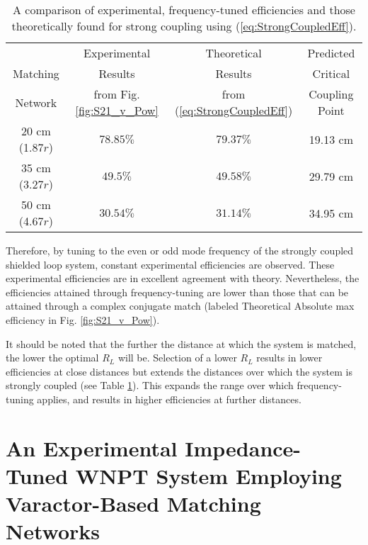 \documentclass[journal]{IEEEtran}
\begin{document}
\begin{table}[htbp]
\centering
\begin{tabular}{|c|c|c|c|}
\hline
                & {Experimental}                    & {Theoretical}                         &  {Predicted} \\
 {Matching}     & {Results}                         & {Results}                             &  {Critical} \\
 {Network}      & {from Fig. \ref{fig:S21_v_Pow}}   & {from (\ref{eq:StrongCoupledEff})}   & {Coupling Point} \\ \hline
20 cm (1.87$r$) & $78.85\%$                         & $79.37\%$                             & 19.13 cm \\ \hline
35 cm (3.27$r$) & $49.5\%$                         & $49.58\%$                              & 29.79 cm \\ \hline
50 cm (4.67$r$) & $30.54\%$                         & $31.14\%$                              & 34.95 cm \\ \hline
\end{tabular}
\caption{A comparison of experimental, frequency-tuned efficiencies and those theoretically found for strong coupling using (\ref{eq:StrongCoupledEff}).}
\label{table:ExpTheory_Comp}
\end{table}

Therefore, by tuning to the even or odd mode frequency of the strongly coupled shielded loop system, constant experimental efficiencies are observed. These experimental efficiencies are in excellent agreement with theory. Nevertheless, the efficiencies attained through frequency-tuning are lower than those that can be attained through a complex conjugate match (labeled Theoretical Absolute max efficiency in  Fig. \ref{fig:S21_v_Pow}).

It should be noted that the further the distance at which the system is matched, the lower the optimal $R_L$ will be. Selection of a lower $R_L$ results in lower efficiencies at close distances but extends the distances over which the system is strongly coupled (see Table \ref{table:ExpTheory_Comp}). This expands the range over which frequency-tuning applies, and results in higher efficiencies at further distances.

\section{An Experimental Impedance-Tuned WNPT System Employing Varactor-Based Matching Networks}
\label{sec:LP_Varactors}
\end{document}
